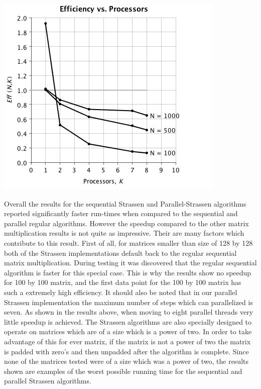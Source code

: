 \documentclass{dependencies/acm_proc_article-sp}
\begin{document}
\begin{center}
\includegraphics[scale=0.5]{images/parallel-stras/eff-vs-proc.png}
\end{center}
Overall the results for the sequential Strassen and Parallel-Strassen
algorithms reported significantly faster run-times when compared to the
sequential and parallel regular algorithms. However the speedup
compared to the other matrix multiplication results is not quite as
impressive. Their are many factors which contribute to this result.
First of all, for matrices smaller than size of 128 by 128 both of the
Strassen implementations default back to the regular sequential matrix
multiplication. During testing it was discovered that the regular sequential
algorithm is faster for this special case. This is why the results show no
speedup for 100 by 100 matrix, and the first data point for the  100 by 100
matrix has such a extremely high efficiency. It should also be noted that in our parallel
Strassen implementation the maximum number of steps which can parallelized is
seven. As shown in the results above, when moving to eight parallel threads
very little speedup is achieved. The Strassen algorithms are also specially
designed to operate on matrices which are of a size which is a power of two.
In order to take advantage of this for ever matrix, if the matrix is not a
power of two the matrix is padded with zero's and then unpadded after the
algorithm is complete. Since none of the matrices tested were of a size which
was a power of two, the results shown are examples of the worst possible
running time for the sequential and parallel Strassen algorithms. 
\end{document}
